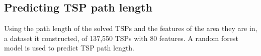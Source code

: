 \subsection{Predicting TSP path length}
Using the path length of the solved TSPs and the features of the area they are in, a dataset it constructed, of 137,550 TSPs with 80 features. A random forest model
is used to predict TSP path length.
